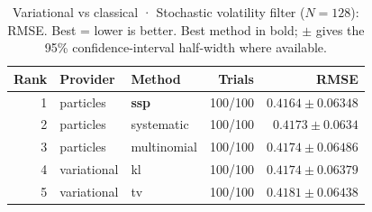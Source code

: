 \begin{table}[!htbp]
\centering
\small
\caption{Variational vs classical · Stochastic volatility filter ($N=128$): RMSE. Best = lower is better. Best method in bold; $\pm$ gives the 95\% confidence-interval half-width where available.}
\label{tab:variational-vs-classical-stochastic-volatility-filter-rmse}
\begin{tabular}{rllrr}
\toprule
Rank & Provider & Method & Trials & RMSE \\
\midrule
1 & particles & \textbf{ssp} & 100/100 & $\mathbf{0.4164 \pm 0.06348}$ \\
2 & particles & systematic & 100/100 & $0.4173 \pm 0.0634$ \\
3 & particles & multinomial & 100/100 & $0.4174 \pm 0.06486$ \\
4 & variational & kl & 100/100 & $0.4174 \pm 0.06379$ \\
5 & variational & tv & 100/100 & $0.4181 \pm 0.06438$ \\
\bottomrule
\end{tabular}
\end{table}
